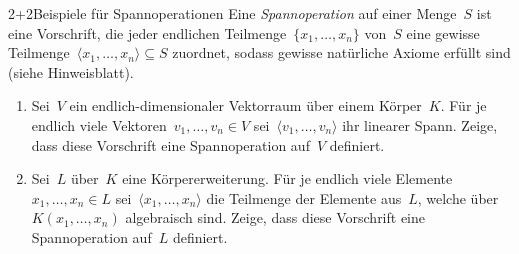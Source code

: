 \documentclass{algblatt}
\begin{document}
\begin{aufgabe}{2+2}{Beispiele für Spannoperationen}
Eine \emph{Spannoperation} auf einer Menge~$S$ ist eine Vorschrift, die jeder
endlichen Teilmenge~$\{x_1,\ldots,x_n\}$ von~$S$ eine gewisse
Teilmenge~$\langle x_1,\ldots,x_n \rangle \subseteq S$ zuordnet, sodass gewisse
natürliche Axiome erfüllt sind (siehe Hinweisblatt).
\begin{enumerate}
\item Sei~$V$ ein endlich-dimensionaler Vektorraum über einem Körper~$K$. Für
je endlich viele Vektoren~$v_1,\ldots,v_n \in V$ sei~$\langle v_1,\ldots,v_n
\rangle$ ihr linearer Spann. Zeige, dass diese Vorschrift eine Spannoperation
auf~$V$ definiert.
\item Sei~$L$ über~$K$ eine Körpererweiterung. Für je endlich viele
Elemente~$x_1,\ldots,x_n \in L$ sei~$\langle x_1,\ldots,x_n \rangle$ die Teilmenge
der Elemente aus~$L$, welche über~$K(x_1,\ldots,x_n)$ algebraisch sind. Zeige,
dass diese Vorschrift eine Spannoperation auf~$L$ definiert.
\end{enumerate}
\end{aufgabe}
\end{document}
